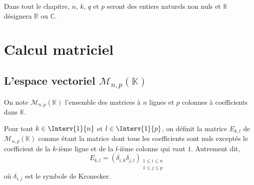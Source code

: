 \documentclass[a4paper,10pt]{report}
\begin{document}



\noindent Dans tout le chapitre, $n$, $k$, $q$ et $p$ seront des entiers naturels non nuls et $\mathbb{K}$ désignera $\mathbb{R}$ ou $\mathbb{C}$.

\section{Calcul matriciel}
\subsection{L'espace vectoriel $\mathcal{M}_{n,p}(\mathbb{K})$}

\noindent On note $\mathcal{M}_{n,p}(\mathbb{K})$ l'ensemble des matrices à $n$ lignes et $p$ colonnes à coefficients dans $\mathbb{K}$.
%
%
%
%
%
%

\medskip

\noindent Pour tout $k\in \Interv{1}{n}$ et $ l \in \Interv{1}{p}$, on définit la matrice $E_{k,l}$ de $\mathcal{M}_{n,p}( \mathbb{K})$ comme étant la matrice dont tous les coefficients sont nuls exceptés le coefficient de la $k$-ième ligne et de la $l$-ième colonne qui vaut $1$. Autrement dit,
$$ E_{k,l} = ( \delta_{i,k} \delta_{j,l})_{\substack{1 \leq i \leq n \\ 1 \leq j \leq p}}$$
où $\delta_{i,j}$ est le symbole de Kronecker.
\end{document}
